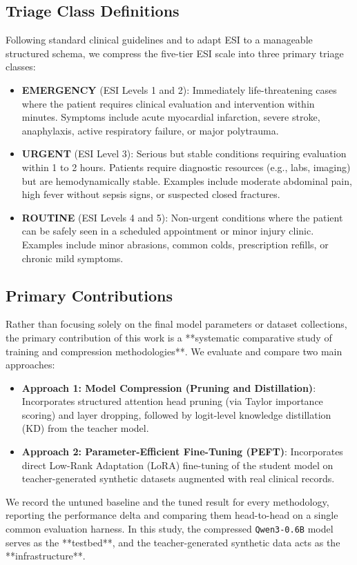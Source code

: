 \documentclass[a4paper, 12pt]{article}
\begin{document}
\subsection{Triage Class Definitions}
Following standard clinical guidelines and to adapt ESI to a manageable structured schema, we compress the five-tier ESI scale into three primary triage classes:
\begin{itemize}
    \item \textbf{EMERGENCY} (ESI Levels 1 and 2): Immediately life-threatening cases where the patient requires clinical evaluation and intervention within minutes. Symptoms include acute myocardial infarction, severe stroke, anaphylaxis, active respiratory failure, or major polytrauma.
    \item \textbf{URGENT} (ESI Level 3): Serious but stable conditions requiring evaluation within 1 to 2 hours. Patients require diagnostic resources (e.g., labs, imaging) but are hemodynamically stable. Examples include moderate abdominal pain, high fever without sepsis signs, or suspected closed fractures.
    \item \textbf{ROUTINE} (ESI Levels 4 and 5): Non-urgent conditions where the patient can be safely seen in a scheduled appointment or minor injury clinic. Examples include minor abrasions, common colds, prescription refills, or chronic mild symptoms.
\end{itemize}

\subsection{Primary Contributions}
\label{subsec:contributions}
Rather than focusing solely on the final model parameters or dataset collections, the primary contribution of this work is a **systematic comparative study of training and compression methodologies**. We evaluate and compare two main approaches:
\begin{itemize}
    \item \textbf{Approach 1: Model Compression (Pruning and Distillation)}: Incorporates structured attention head pruning (via Taylor importance scoring) and layer dropping, followed by logit-level knowledge distillation (KD) from the teacher model.
    \item \textbf{Approach 2: Parameter-Efficient Fine-Tuning (PEFT)}: Incorporates direct Low-Rank Adaptation (LoRA) fine-tuning of the student model on teacher-generated synthetic datasets augmented with real clinical records.
\end{itemize}
We record the untuned baseline and the tuned result for every methodology, reporting the performance delta and comparing them head-to-head on a single common evaluation harness. In this study, the compressed \texttt{Qwen3-0.6B} model serves as the **testbed**, and the teacher-generated synthetic data acts as the **infrastructure**.
\end{document}
